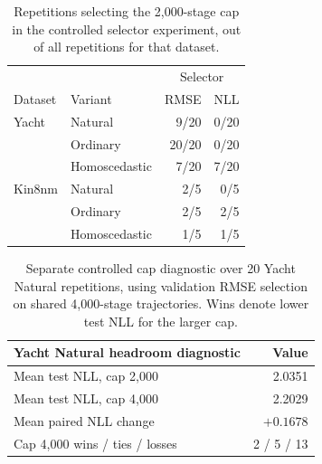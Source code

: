 \begin{table}[ht]
\centering
\small
\setlength{\tabcolsep}{3pt}
\begin{tabular}{@{}llrr@{}}
\toprule
& & \multicolumn{2}{c}{Selector} \\
Dataset & Variant & RMSE & NLL \\
\midrule
Yacht & Natural & 9/20 & 0/20 \\
& Ordinary & 20/20 & 0/20 \\
& Homoscedastic & 7/20 & 7/20 \\
\midrule
Kin8nm & Natural & 2/5 & 0/5 \\
& Ordinary & 2/5 & 2/5 \\
& Homoscedastic & 1/5 & 1/5 \\
\bottomrule
\end{tabular}
\caption{Repetitions selecting the 2{,}000-stage cap in the controlled selector experiment, out of all repetitions for that dataset.}
\label{tab:replication-caps}
\end{table}

\begin{table}[ht]
\centering
\small
\begin{tabular}{@{}lr@{}}
\toprule
Yacht Natural headroom diagnostic & Value \\
\midrule
Mean test NLL, cap 2{,}000 & 2.0351 \\
Mean test NLL, cap 4{,}000 & 2.2029 \\
Mean paired NLL change & $+0.1678$ \\
Cap 4{,}000 wins / ties / losses & 2 / 5 / 13 \\
\bottomrule
\end{tabular}
\caption{Separate controlled cap diagnostic over 20 Yacht Natural repetitions, using validation RMSE selection on shared 4{,}000-stage trajectories.
Wins denote lower test NLL for the larger cap.}
\label{tab:headroom}
\end{table}
